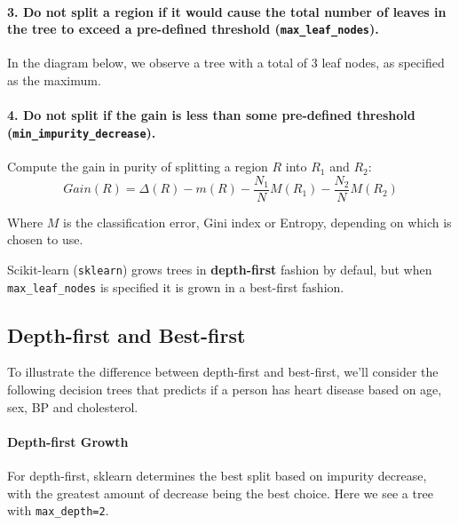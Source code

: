 \documentclass[11pt,a4paper]{report}
\begin{document}
\paragraph{3. Do not split a region if it would cause the total number of leaves in the tree to exceed a pre-defined threshold (\texttt{max\_leaf\_nodes}).}In the diagram below, we observe a tree with a total of 3 leaf nodes, as specified as the maximum.\\
\paragraph{4. Do not split if the gain is less than some pre-defined threshold (\texttt{min\_impurity\_decrease}).}Compute the gain in purity of splitting a region $R$ into $R_1$ and $R_2$:$$Gain(R) = \Delta(R) - m(R) - \frac{N_1}{N}M(R_1) - \frac{N_2}{N}M(R_2)$$
\begin{framed}
Where $M$ is the 	classification error, Gini index or Entropy, depending on which is chosen to use.
\end{framed}
Scikit-learn (\texttt{sklearn}) grows trees in \textbf{depth-first} fashion by defaul, but when \texttt{max\_leaf\_nodes} is specified it is grown in a best-first fashion.
\subsection{Depth-first and Best-first}
To illustrate the difference between depth-first and best-first, we’ll consider the following decision trees that predicts if a person has heart disease based on age, sex, BP and cholesterol.
\paragraph{Depth-first Growth}For depth-first, sklearn determines the best split based on impurity decrease, with the greatest amount of decrease being the best choice. Here we see a tree with \texttt{max\_depth=2}.\\
\end{document}
